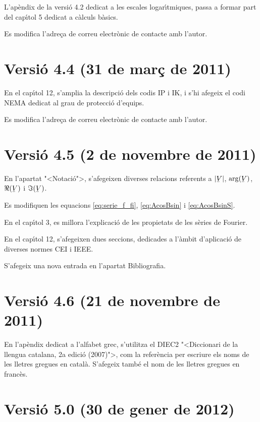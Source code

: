 L'ap\`{e}ndix de la versi\'{o} 4.2 dedicat a les escales logar\'{\i}tmiques, passa a formar part del cap\'{\i}tol 5 dedicat a c\`{a}lculs b\`{a}sics.

Es modifica l'adre\c{c}a de correu electr\`{o}nic de contacte amb l'autor.

\section*{Versi\'{o} 4.4 (31 de mar\c{c} de 2011)}
En el cap\'{\i}tol 12, s'amplia la descripci\'{o} dels codis IP i IK, i s'hi afegeix el codi NEMA dedicat al grau de protecci\'{o} d'equips.

Es modifica l'adre\c{c}a de correu electr\`{o}nic de contacte amb l'autor.

\section*{Versi\'{o} 4.5 (2 de novembre de 2011)}
En l'apartat {"<}Notaci\'{o}{">}, s'afegeixen diverses relacions referents a $|\cmplx{V}|$, $\arg(\cmplx{V})$, $\Re(\cmplx{V})$ i $\Im(\cmplx{V})$.

Es modifiquen les equacions \eqref{eq:serie_f_fi}, \eqref{eq:AcosBsin} i \eqref{eq:AcosBsinS}.

En el cap\'{\i}tol 3, es millora l'explicaci\'{o} de les propietats de les s\`{e}ries de Fourier.

En el cap\'{\i}tol 12, s'afegeixen dues seccions, dedicades a l'\`{a}mbit d'aplicaci\'{o} de diverses normes \textsf{CEI} i \textsf{IEEE}.

S'afegeix una nova entrada en l'apartat Bibliografia.


\section*{Versi\'{o} 4.6 (21 de novembre de 2011)}

En l'ap\`{e}ndix dedicat a l'alfabet grec, s'utilitza el DIEC2 {"<}Diccionari de la llengua catalana, 2a edici\'{o} (2007){">}, com la refer\`{e}ncia per escriure els noms de les lletres gregues en catal\`{a}. S'afegeix tamb\'{e} el nom de les lletres gregues en franc\`{e}s.


\section*{Versi\'{o} 5.0 (30 de gener de 2012)}

